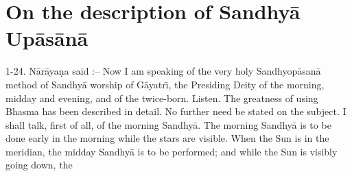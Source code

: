 \chapter{On the description of Sandhy\=a Up\=as\=an\=a}

1-24. N\=ar\=aya\d{n}a said :-- Now I am speaking of the very holy Sandhyop\=asan\=a method of Sandhy\=a worship of G\=ayatr\={\i}, the Presiding Deity of the morning, midday and evening, and of the twice-born. Listen. The greatness of using Bhasma has been described in detail. No further need be stated on the subject. I shall talk, first of all, of the morning Sandhy\=a. The morning Sandhy\=a is to be done early in the morning while the stars are visible. When the Sun is in the meridian, the midday Sandhy\=a is to be performed; and while the Sun is visibly going down, the

